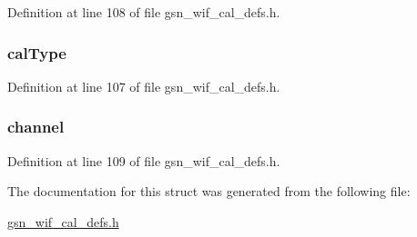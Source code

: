 Definition at line 108 of file gsn\_\-wif\_\-cal\_\-defs.h.

\hypertarget{a00319_a33f2f5fd3dc581e4f9f46f02e03c5363}{
\subsubsection[{calType}]{ {\bf calType}}}
\label{a00319_a33f2f5fd3dc581e4f9f46f02e03c5363}


Definition at line 107 of file gsn\_\-wif\_\-cal\_\-defs.h.

\hypertarget{a00319_a3b166120eb9acba31a786d05b6319f90}{
\subsubsection[{channel}]{ {\bf channel}}}
\label{a00319_a3b166120eb9acba31a786d05b6319f90}


Definition at line 109 of file gsn\_\-wif\_\-cal\_\-defs.h.



The documentation for this struct was generated from the following file:\begin{DoxyCompactItemize}
\item 
\hyperlink{a00607}{gsn\_\-wif\_\-cal\_\-defs.h}\end{DoxyCompactItemize}
